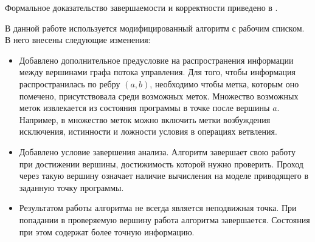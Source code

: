Формальное доказательство завершаемости и корректности приведено в
\cite{Nielson1999}.

В данной работе используется модифицированный алгоритм с рабочим
списком. В него внесены следующие изменения:
\begin{itemize}
  \item Добавлено дополнительное предусловие на распространения
    информации между вершинами графа потока управления.  Для того,
    чтобы информация распространилась по ребру $(a, b)$, необходимо
    чтобы метка, которым оно помечено, присутствовала среди возможных
    меток. Множество возможных меток извлекается из состояния
    программы в точке после вершины $a$. Например, в множество меток
    можно включить метки возбуждения исключения, истинности и ложности
    условия в операциях ветвления.

  \item Добавлено условие завершения анализа. Алгоритм завершает свою
    работу при достижении вершины, достижимость которой нужно
    проверить. Проход через такую вершину означает наличие вычисления
    на моделе приводящего в заданную точку программы.

  \item Результатом работы алгоритма не всегда является неподвижная
    точка. При попадании в проверяемую вершину работа алгоритма
    завершается. Состояния при этом содержат более точную информацию.
\end{itemize}

